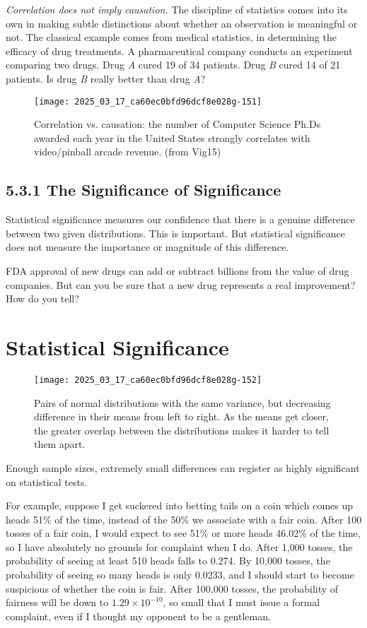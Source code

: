 \documentclass[10pt]{article}
\begin{document}
\textit{Correlation does not imply causation.} The discipline of statistics comes into its own in making subtle distinctions about whether an observation is meaningful or not. The classical example comes from medical statistics, in determining the efficacy of drug treatments. A pharmaceutical company conducts an experiment comparing two drugs. Drug \textit{A} cured 19 of 34 patients. Drug \textit{B} cured 14 of 21 patients. Is drug \textit{B} really better than drug \textit{A}? 

\begin{figure}[H]
\centering
\texttt{[image: 2025\_03\_17\_ca60ec0bfd96dcf8e028g-151]}
\caption{Correlation vs. causation: the number of Computer Science Ph.Ds awarded each year in the United States strongly correlates with video/pinball arcade revenue. (from Vig15)}
\end{figure}

\subsection*{5.3.1 The Significance of Significance}
Statistical significance measures our confidence that there is a genuine difference between two given distributions. This is important. But statistical significance does not measure the importance or magnitude of this difference. 

FDA approval of new drugs can add or subtract billions from the value of drug companies. But can you be sure that a new drug represents a real improvement? How do you tell?
\section{Statistical Significance}

\begin{figure}[H]
\centering
\texttt{[image: 2025\_03\_17\_ca60ec0bfd96dcf8e028g-152]}
\caption{Pairs of normal distributions with the same variance, but decreasing difference in their means from left to right. As the means get closer, the greater overlap between the distributions makes it harder to tell them apart.}
\end{figure}

Enough sample sizes, extremely small differences can register as highly significant on statistical tests.

For example, suppose I get suckered into betting tails on a coin which comes up heads 51\% of the time, instead of the 50\% we associate with a fair coin. After 100 tosses of a fair coin, I would expect to see 51\% or more heads 46.02\% of the time, so I have absolutely no grounds for complaint when I do. After 1,000 tosses, the probability of seeing at least 510 heads falls to 0.274. By 10,000 tosses, the probability of seeing so many heads is only 0.0233, and I should start to become suspicious of whether the coin is fair. After 100,000 tosses, the probability of fairness will be down to $1.29 \times 10^{-10}$, so small that I must issue a formal complaint, even if I thought my opponent to be a gentleman.
\end{document}
